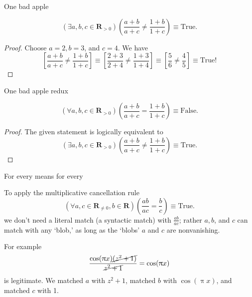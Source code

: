\documentclass[portrait,fleqn,12pt]{beamer}
\newcommand{\reals}{\mathbf{R}}
\begin{document}
\begin{frame}{One bad apple}
\begin{theorem}
  \begin{equation*}
    \left(\exists a,b,c \in \reals_{>0}\right)
       \left(\frac{a+b}{a+c} \neq \frac{1 + b}{1 + c} \right) \equiv \mbox{True}.
 \end{equation*}
\end{theorem}
\begin{proof} Choose $a=2,b=3$, and $c=4$. We have
  \begin{equation*}
    \left[\frac{a+b}{a+c} \neq \frac{1 + b}{1 + c} \right] \equiv
    \left[\frac{2+3}{2+4} \neq \frac{1 + 3}{1 + 4} \right]  \equiv
    \left [\frac{5}{6} \neq \frac{4}{5} \right]  \equiv \mbox{True!}
  \end{equation*}
\end{proof}
\end{frame}

\begin{frame}{One bad apple redux}
  \begin{theorem}
    \begin{equation*}
      \left(\forall  a,b,c \in \reals_{>0}\right)
         \left(\frac{a+b}{a+c} = \frac{1 + b}{1 + c} \right) \equiv \mbox{False}.
   \end{equation*}
  \end{theorem}
  \begin{proof} The given statement is logically equivalent to 
    \begin{equation*}
      \left(\exists a,b,c \in \reals_{>0}\right)
      \left(\frac{a+b}{a+c} \neq \frac{1 + b}{1 + c} \right) \equiv \mbox{True}.
    \end{equation*}
    \end{proof}
  \end{frame}


\begin{frame}{For every means for every}

To apply the multiplicative cancellation rule
\begin{equation*} 
   \left(\forall a, c\in \reals_{\neq 0}, b \in \reals \right)\left(\frac{a b}{a c} = \frac{b}{c} \right) \equiv \text{True}.
  \end{equation*}
 we don't need a literal match (a syntactic match) with $\frac{a b}{a c}$; rather $a,b$, and $c$ can match with any `blob,'  as long as
 the `blobs'  $a$ and $c$ are nonvanishing.
 
For example
\begin{equation*}
   \frac{ \cos(\uppi x) \cancel{ (z^2 + 1)}}{ \cancel{z^2 + 1} } =  \cos(\uppi x)
\end{equation*}
is legitimate.  We matched $a$ with $z^2 + 1$,  matched $b$ with $ \cos(\uppi x) $, and matched $c$ with 1.


\end{frame}
\end{document}
